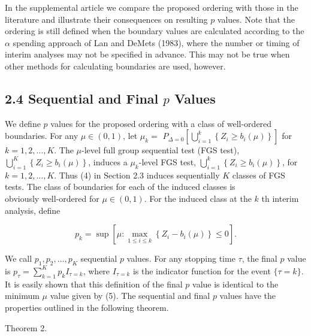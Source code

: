 \documentclass[10pt]{article}
\begin{document}
In the supplemental article we compare the proposed ordering with those in the literature and illustrate their consequences on resulting $p$ values. Note that the ordering is still defined when the boundary values are calculated according to the $\alpha$ spending approach of Lan and DeMets (1983), where the number or timing of interim analyses may not be specified in advance. This may not be true when other methods for calculating boundaries are used, however.

\subsection*{2.4 Sequential and Final $p$ Values}
We define $p$ values for the proposed ordering with a class of well-ordered boundaries. For any $\mu \in(0,1)$, let $\mu_{k}=$ $P_{\Delta=0}\left[\bigcup_{i=1}^{k}\left\{Z_{i} \geq b_{i}(\mu)\right\}\right]$ for $k=1,2, \ldots, K$. The $\mu$-level full group sequential test (FGS test), $\bigcup_{i=1}^{K}\left\{Z_{i} \geq b_{i}(\mu)\right\}$, induces a $\mu_{k}$-level FGS test, $\bigcup_{i=1}^{k}\left\{Z_{i} \geq b_{i}(\mu)\right\}$, for $k=1,2, \ldots, K$. Thus (4) in Section 2.3 induces sequentially $K$ classes of FGS tests. The class of boundaries for each of the induced classes is\\
obviously well-ordered for $\mu \in(0,1)$. For the induced class at the $k$ th interim analysis, define


\begin{equation*}
p_{k}=\sup \left[\mu: \max _{1 \leq i \leq k}\left\{Z_{i}-b_{i}(\mu)\right\} \leq 0\right] . \tag{6}
\end{equation*}


We call $p_{1}, p_{2}, \ldots, p_{K}$ sequential $p$ values. For any stopping time $\tau$, the final $p$ value is $p_{\tau}=\sum_{k=1}^{K} p_{k} I_{\tau=k}$, where $I_{\tau=k}$ is the indicator function for the event $\{\tau=k\}$. It is easily shown that this definition of the final $p$ value is identical to the minimum $\mu$ value given by (5). The sequential and final $p$ values have the properties outlined in the following theorem.

Theorem 2.
\end{document}
